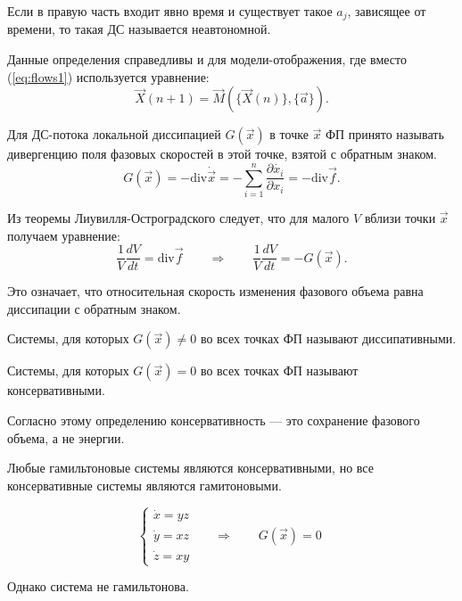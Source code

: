 \begin{definition}[Неавтономная ДС]
	Если в правую часть входит явно время и существует такое $a_j$, зависящее от времени, то такая ДС называется неавтономной. 
\end{definition}

Данные определения справедливы и для модели-отображения, где вместо (\ref{eq:flows1}) используется уравнение:
\begin{equation}\label{eq:maps1}
	\vec{X}(n+1)=\vec{M}(\{\vec{X}(n)\}, \{\vec{a}\}).
\end{equation}

\begin{definition}
	Для ДС-потока локальной диссипацией $G(\vec{x})$ в точке $\vec{x}$ ФП принято называть дивергенцию поля фазовых скоростей в этой точке, взятой с обратным знаком.
	$$G(\vec{x})=-\mathrm{div}\dot{\vec{x}}=-\sum\limits_{i=1}^{n}\frac{\partial \dot{x_i}}{\partial x_i}=-\mathrm{div}\vec{f}.$$
\end{definition}

Из теоремы Лиувилля-Остроградского следует, что для малого $V$ вблизи точки $\vec{x}$ получаем уравнение:
$$\frac{1}{V} \frac{dV}{dt}=\mathrm{div}\vec{f} \qquad \Rightarrow \qquad \frac{1}{V} \frac{dV}{dt}=-G(\vec{x}).$$

Это означает, что относительная скорость изменения фазового объема равна диссипации с обратным знаком.

\begin{definition}
	Системы, для которых $G(\vec{x})\neq 0$ во всех точках ФП называют диссипативными.
\end{definition}

\begin{definition}
	Системы, для которых $G(\vec{x})=0$ во всех точках ФП называют консервативными.
\end{definition}

\begin{remark}
	Согласно этому определению консервативность --- это сохранение фазового объема, а не энергии.
\end{remark}

Любые гамильтоновые системы являются консервативными, но все консервативные системы являются гамитоновыми.

\begin{example}
	\begin{equation}
		\begin{cases}
			\dot{x}=yz \\
			\dot{y}=xz \qquad \Rightarrow \qquad G(\vec{x})=0 \\
			\dot{z}=xy 
		\end{cases}
	\end{equation}
	
	Однако система не гамильтонова.
\end{example}

